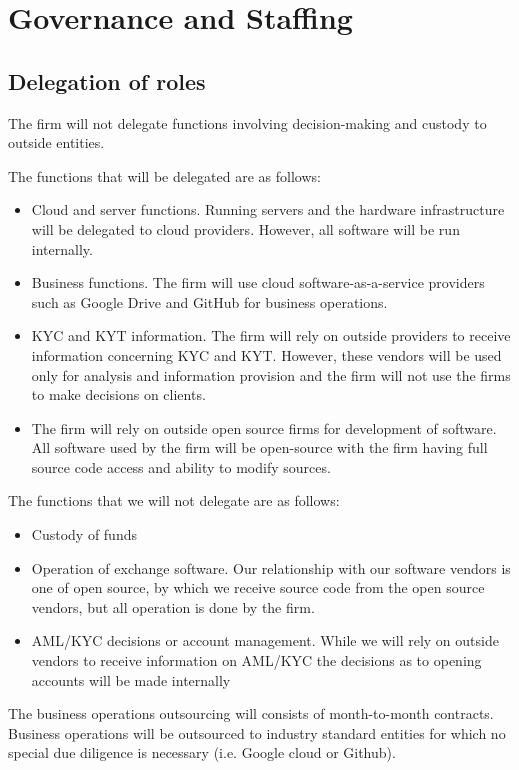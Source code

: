 \chapter{Governance and Staffing}

\section{Delegation of roles}

The firm will not delegate functions involving decision-making and
custody to outside entities.

The functions that will be delegated are as follows:
\begin{itemize}
  \item Cloud and server functions.  Running servers and the hardware
    infrastructure will be delegated to cloud providers.  However, all
    software will be run internally.
 \item Business functions.  The firm will use cloud software-as-a-service providers such
   as Google Drive and GitHub for business operations.
 \item KYC and KYT information.  The firm will rely on outside
   providers to receive information concerning KYC and KYT.  However,
   these vendors will be used only for analysis and information
   provision and the firm will not use the firms to make decisions on
   clients.
\item The firm will rely on outside open source firms for development
  of software.  All software used by the firm will be open-source with
  the firm having full source code access and ability to modify sources.
\end{itemize}

The functions that we will not delegate are as follows:
\begin{itemize}
\item Custody of funds
  \item Operation of exchange software.  Our relationship with our
    software vendors is one of open source, by which we receive source
    code from the open source vendors, but all operation is done by
    the firm.
 \item AML/KYC decisions or account management.  While we will rely on
   outside vendors to receive information on AML/KYC the decisions as
   to opening accounts will be made internally
\end{itemize}

The business operations outsourcing will consists of month-to-month
contracts.  Business operations will be outsourced to industry
standard entities for which no special due diligence is necessary
(i.e. Google cloud or Github).

